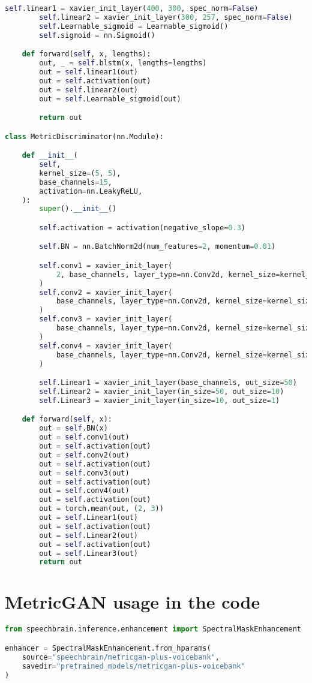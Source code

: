 \begin{lstlisting}[language=Python, caption={MetricGAN Model}]
        self.linear1 = xavier_init_layer(400, 300, spec_norm=False)
        self.linear2 = xavier_init_layer(300, 257, spec_norm=False)
        self.Learnable_sigmoid = Learnable_sigmoid()
        self.sigmoid = nn.Sigmoid()

    def forward(self, x, lengths):
        out, _ = self.blstm(x, lengths=lengths)
        out = self.linear1(out)
        out = self.activation(out)
        out = self.linear2(out)
        out = self.Learnable_sigmoid(out)

        return out

class MetricDiscriminator(nn.Module):

    def __init__(
        self,
        kernel_size=(5, 5),
        base_channels=15,
        activation=nn.LeakyReLU,
    ):
        super().__init__()

        self.activation = activation(negative_slope=0.3)

        self.BN = nn.BatchNorm2d(num_features=2, momentum=0.01)

        self.conv1 = xavier_init_layer(
            2, base_channels, layer_type=nn.Conv2d, kernel_size=kernel_size
        )
        self.conv2 = xavier_init_layer(
            base_channels, layer_type=nn.Conv2d, kernel_size=kernel_size
        )
        self.conv3 = xavier_init_layer(
            base_channels, layer_type=nn.Conv2d, kernel_size=kernel_size
        )
        self.conv4 = xavier_init_layer(
            base_channels, layer_type=nn.Conv2d, kernel_size=kernel_size
        )

        self.Linear1 = xavier_init_layer(base_channels, out_size=50)
        self.Linear2 = xavier_init_layer(in_size=50, out_size=10)
        self.Linear3 = xavier_init_layer(in_size=10, out_size=1)

    def forward(self, x):
        out = self.BN(x)
        out = self.conv1(out)
        out = self.activation(out)
        out = self.conv2(out)
        out = self.activation(out)
        out = self.conv3(out)
        out = self.activation(out)
        out = self.conv4(out)
        out = self.activation(out)
        out = torch.mean(out, (2, 3))
        out = self.Linear1(out)
        out = self.activation(out)
        out = self.Linear2(out)
        out = self.activation(out)
        out = self.Linear3(out)
        return out
\end{lstlisting}


\section{MetricGAN usage in the code} \label{appendix:metricgan_in_code}
\begin{lstlisting}[language=Python, caption={How the MetricGAN is Used in the System}]
from speechbrain.inference.enhancement import SpectralMaskEnhancement

enhancer = SpectralMaskEnhancement.from_hparams(
    source="speechbrain/metricgan-plus-voicebank",
    savedir="pretrained_models/metricgan-plus-voicebank"
)

\end{lstlisting}